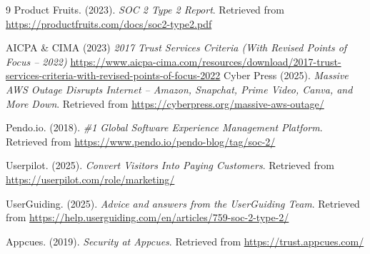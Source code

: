 \documentclass[14pt]{article}
\theoremstyle{definition}
\begin{document}
\newpage
{}

\begin{thebibliography}{9}
Product Fruits. (2023). 
\textit{SOC 2 Type 2 Report}. 
Retrieved from \url{https://productfruits.com/docs/soc2-type2.pdf}

  AICPA \& CIMA (2023)
\textit{2017 Trust Services Criteria (With Revised Points of Focus – 2022)}
\url{https://www.aicpa-cima.com/resources/download/2017-trust-services-criteria-with-revised-points-of-focus-2022} \label{soc2_guide}
Cyber Press (2025). 
\textit{Massive AWS Outage Disrupts Internet – Amazon, Snapchat, Prime Video, Canva, and More Down}. 
Retrieved from \url{https://cyberpress.org/massive-aws-outage/} \label{aws_incident}


Pendo.io. (2018). 
\textit{\#1 Global Software Experience Management Platform}. 
Retrieved from \url{https://www.pendo.io/pendo-blog/tag/soc-2/} 

Userpilot. (2025). \textit{Convert Visitors Into Paying Customers}. 
Retrieved from \url{https://userpilot.com/role/marketing/}

UserGuiding. (2025). \textit{Advice and answers from the UserGuiding Team}. 
Retrieved from \url{https://help.userguiding.com/en/articles/759-soc-2-type-2/}

Appcues. (2019). \textit{Security at Appcues}. 
Retrieved from \url{https://trust.appcues.com/}
\end{thebibliography} 
\end{document}
